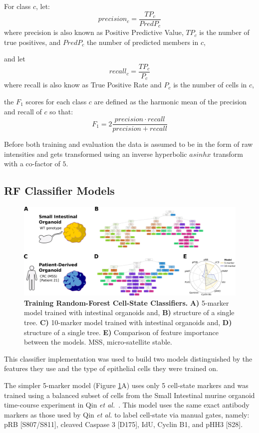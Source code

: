  For class $c$, let:
\[precision_c = \frac{TP_c}{PredP_c}\]
where precision is also known as Positive Predictive Value, $TP_c$ is the number of true positives, and $PredP_c$ the number of predicted members in $c$,

and let
\[recall_c = \frac{TP_c}{P_c}\]
where recall is also know as True Positive Rate and $P_c$ is the number of cells in $c$,

the $F_1$ scores for each class $c$ are defined as the harmonic mean of the precision and recall of $c$ so that:
\[F_1 = 2 \frac{precision \cdot recall}{precision + recall}\]

Before both training and evaluation the data is assumed to be in the form of raw intensities and gets transformed using an inverse hyperbolic \(asinh x\) transform with a co-factor of \(5\). 

\subsection{RF Classifier Models}

\begin{figure}[H]
    \centering
    \includegraphics{02methods/figs/2CYTOF_trainRFclass.png}
    \caption{\textbf{Training Random-Forest Cell-State Classifiers.} \textbf{A)} 5-marker model trained with intestinal organoids and, \textbf{B)} structure of a single tree. \textbf{C)} 10-marker model trained with intestinal organoids and, \textbf{D)} structure of a single tree. \textbf{E)} Comparison of feature importance between the models. MSS, micro-satellite stable.}
    \label{fig:2train}
\end{figure}

This classifier implementation was used to build two models distinguished by the features they use and the type of epithelial cells they were trained on. 

The simpler 5-marker model (Figure \ref{fig:2train}A) uses only 5 cell-state markers and was trained using a balanced subset of cells from the Small Intestinal murine organoid time-course experiment in Qin \emph{et al.}~\cite{qin_cell-type-specific_2020}. This model uses the same exact antibody markers as those used by Qin \emph{et al.} to label cell-state via manual gates, namely: pRB [S807/S811], cleaved Caspase 3 [D175], IdU, Cyclin B1, and pHH3 [S28].


